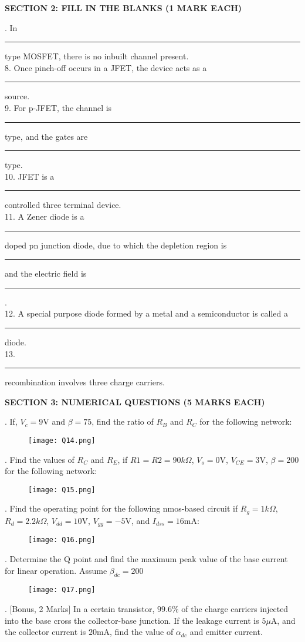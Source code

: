 \documentclass[12pt]{article}\date{}
\begin{document}
\begin{large}
\textbf{SECTION 2: FILL IN THE BLANKS (1 MARK EACH)} \\[30pt]
\end{large} 

. In \rule{1cm}{0.15mm} type MOSFET, there is no inbuilt channel present. \\
8. Once pinch-off occurs in a JFET, the device acts as a \rule{1cm}{0.15mm} source. \\
9. For p-JFET, the channel is \rule{1cm}{0.15mm} type, and the gates are \rule{1cm}{0.15mm} type.\\
10. JFET is a \rule{1cm}{0.15mm} controlled three terminal device. \\
11. A Zener diode is a \rule{1cm}{0.15mm} doped pn junction diode, due to which the depletion region is \rule{1cm}{0.15mm} and the electric field is \rule{1cm}{0.15mm}. \\
12. A special purpose diode formed by a metal and a semiconductor is called a \rule{1cm}{0.15mm} diode. \\
13. \rule{1cm}{0.15mm}recombination involves three charge carriers.\\[30pt]

\begin{large}
\textbf{SECTION 3: NUMERICAL QUESTIONS (5 MARKS EACH)} \\[30pt]
\end{large} 

. If, $V_c=9$V and $\beta =75$, find the ratio of $R_B$ and $R_C$ for the following network:

\begin{figure}[!ht]
  \centering
  \texttt{[image: Q14.png]}
\end{figure}

. Find the values of $R_C$ and $R_E$, if $R1=R2=90k \Omega$, $V_o=0$V, $V_{CE}=3$V, $\beta=200$ for the following network:

\begin{figure}[!ht]
  \centering
  \texttt{[image: Q15.png]}
\end{figure}

.  Find the operating point for the following nmos-based circuit if $R_g=1k \Omega $, $R_d=2.2k \Omega $, $V_{dd}=10$V, $V_{gg}=-5$V, and $I_{dss}=16$mA:
\begin{figure}[!ht]
  \centering
  \texttt{[image: Q16.png]}
\end{figure}

.  Determine the Q point and find the maximum peak value of the base current for linear operation. Assume $\beta_{dc}=200$
\begin{figure}[!ht]
  \centering
  \texttt{[image: Q17.png]}
\end{figure}

. [Bonus, 2 Marks] In a certain transistor, $99.6\% $ of the charge carriers injected into the base cross the collector-base junction. If the leakage current is $5\mu$A, and the collector current is $20$mA, find the value of $\alpha_{dc}$ and emitter current. \\ [15pt]
\end{document}
